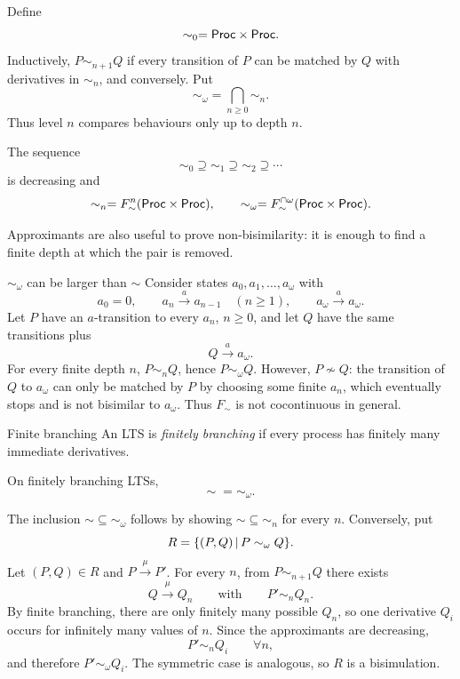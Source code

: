 \documentclass[a4paper]{article}
\newcommand{\Proc}{\mathsf{Proc}}
\newcommand{\trans}[1]{\xrightarrow{#1}}
\begin{document}
Define
\[
    \sim_0 = \Proc\cartesianprod\Proc.
\]
Inductively, \(P\sim_{n+1}Q\) if every transition of \(P\) can be matched by \(Q\) with derivatives in \(\sim_n\), and conversely.
Put
\[
    \sim_\omega
    =
    \bigcap_{n\geq0}\sim_n.
\]
Thus level \(n\) compares behaviours only up to depth \(n\).

\begin{snippetproposition}{}
    The sequence
    \[
        \sim_0\supseteq\sim_1\supseteq\sim_2\supseteq\cdots
    \]
    is decreasing and
    \[
        \sim_n
        =
        F_{\sim}^n(\Proc\cartesianprod\Proc),
        \qquad
        \sim_\omega
        =
        F_{\sim}^{\cap\omega}(\Proc\cartesianprod\Proc).
    \]
\end{snippetproposition}

Approximants are also useful to prove non-bisimilarity: it is enough to find a finite depth at which the pair is removed.

\begin{snippetexample}{\(\sim_\omega\) can be larger than \(\sim\)}
    Consider states \(a_0,a_1,\ldots,a_\omega\) with
    \[
        a_0=0,
        \qquad
        a_n\trans{a}a_{n-1}\quad(n\geq1),
        \qquad
        a_\omega\trans{a}a_\omega.
    \]
    Let \(P\) have an \(a\)-transition to every \(a_n\), \(n\geq0\), and let \(Q\) have the same transitions plus
    \[
        Q\trans{a}a_\omega.
    \]
    For every finite depth \(n\), \(P\sim_nQ\), hence \(P\sim_\omega Q\).
    However, \(P\not\sim Q\): the transition of \(Q\) to \(a_\omega\) can only be matched by \(P\) by choosing some finite \(a_n\), which eventually stops and is not bisimilar to \(a_\omega\).
    Thus \(F_{\sim}\) is not cocontinuous in general.
\end{snippetexample}

\begin{snippetdefinition}{Finite branching}
    An LTS is \emph{finitely branching} if every process has finitely many immediate derivatives.
\end{snippetdefinition}

\begin{snippettheorem}{}
    On finitely branching LTSs,
    \[
        \sim\;=\sim_\omega.
    \]
\end{snippettheorem}

\begin{snippetproof}{}
    The inclusion \(\sim\subseteq\sim_\omega\) follows by showing \(\sim\subseteq\sim_n\) for every \(n\).
    Conversely, put
    \[
        R=\{(P,Q)\,|\, P\sim_\omega Q\}.
    \]
    Let \((P,Q)\in R\) and \(P\trans{\mu}P'\).
    For every \(n\), from \(P\sim_{n+1}Q\) there exists
    \[
        Q\trans{\mu}Q_n
        \qquad\text{with}\qquad
        P'\sim_nQ_n.
    \]
    By finite branching, there are only finitely many possible \(Q_n\), so one derivative \(Q_i\) occurs for infinitely many values of \(n\).
    Since the approximants are decreasing,
    \[
        P'\sim_nQ_i
        \qquad\forall n,
    \]
    and therefore \(P'\sim_\omega Q_i\).
    The symmetric case is analogous, so \(R\) is a bisimulation.
\end{snippetproof}
\end{document}
